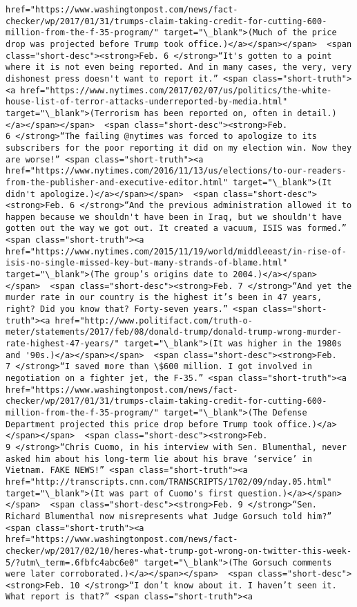 \documentclass[11pt]{article}
\begin{document}
\begin{Verbatim}[commandchars=\\\{\}]
href="https://www.washingtonpost.com/news/fact-checker/wp/2017/01/31/trumps-claim-taking-credit-for-cutting-600-million-from-the-f-35-program/" target="\_blank">(Much of the price drop was projected before Trump took office.)</a></span></span>  <span class="short-desc"><strong>Feb. 6 </strong>“It's gotten to a point where it is not even being reported. And in many cases, the very, very dishonest press doesn't want to report it.” <span class="short-truth"><a href="https://www.nytimes.com/2017/02/07/us/politics/the-white-house-list-of-terror-attacks-underreported-by-media.html" target="\_blank">(Terrorism has been reported on, often in detail.)</a></span></span>  <span class="short-desc"><strong>Feb. 6 </strong>“The failing @nytimes was forced to apologize to its subscribers for the poor reporting it did on my election win. Now they are worse!” <span class="short-truth"><a href="https://www.nytimes.com/2016/11/13/us/elections/to-our-readers-from-the-publisher-and-executive-editor.html" target="\_blank">(It didn't apologize.)</a></span></span>  <span class="short-desc"><strong>Feb. 6 </strong>“And the previous administration allowed it to happen because we shouldn't have been in Iraq, but we shouldn't have gotten out the way we got out. It created a vacuum, ISIS was formed.” <span class="short-truth"><a href="https://www.nytimes.com/2015/11/19/world/middleeast/in-rise-of-isis-no-single-missed-key-but-many-strands-of-blame.html" target="\_blank">(The group’s origins date to 2004.)</a></span></span>  <span class="short-desc"><strong>Feb. 7 </strong>“And yet the murder rate in our country is the highest it’s been in 47 years, right? Did you know that? Forty-seven years.” <span class="short-truth"><a href="http://www.politifact.com/truth-o-meter/statements/2017/feb/08/donald-trump/donald-trump-wrong-murder-rate-highest-47-years/" target="\_blank">(It was higher in the 1980s and '90s.)</a></span></span>  <span class="short-desc"><strong>Feb. 7 </strong>“I saved more than \$600 million. I got involved in negotiation on a fighter jet, the F-35.” <span class="short-truth"><a href="https://www.washingtonpost.com/news/fact-checker/wp/2017/01/31/trumps-claim-taking-credit-for-cutting-600-million-from-the-f-35-program/" target="\_blank">(The Defense Department projected this price drop before Trump took office.)</a></span></span>  <span class="short-desc"><strong>Feb. 9 </strong>“Chris Cuomo, in his interview with Sen. Blumenthal, never asked him about his long-term lie about his brave ‘service’ in Vietnam. FAKE NEWS!” <span class="short-truth"><a href="http://transcripts.cnn.com/TRANSCRIPTS/1702/09/nday.05.html" target="\_blank">(It was part of Cuomo's first question.)</a></span></span>  <span class="short-desc"><strong>Feb. 9 </strong>“Sen. Richard Blumenthal now misrepresents what Judge Gorsuch told him?” <span class="short-truth"><a href="https://www.washingtonpost.com/news/fact-checker/wp/2017/02/10/heres-what-trump-got-wrong-on-twitter-this-week-5/?utm\_term=.6fbfc4abc6e0" target="\_blank">(The Gorsuch comments were later corroborated.)</a></span></span>  <span class="short-desc"><strong>Feb. 10 </strong>“I don’t know about it. I haven’t seen it. What report is that?” <span class="short-truth"><a 
\end{Verbatim}
\end{document}

